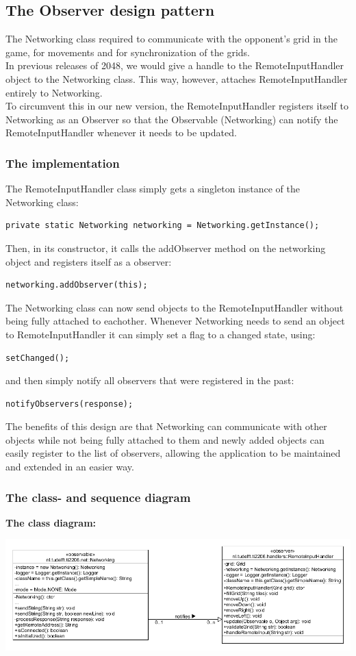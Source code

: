 \documentclass[a4paper,11pt,report]{scrartcl}
\begin{document}
\newpage\subsection{The Observer design pattern}
The Networking class required to communicate with the opponent's grid in the
game, for movements and for synchronization of the grids.\\

In previous releases of 2048, we would give a handle to the RemoteInputHandler
object to the Networking class. This way, however, attaches RemoteInputHandler
entirely to Networking.\\

To circumvent this in our new version, the RemoteInputHandler registers itself
to Networking as an Observer so that the Observable (Networking) can notify the
RemoteInputHandler whenever it needs to be updated.

\subsubsection{The implementation}
The RemoteInputHandler class simply gets a singleton instance of the Networking
class:
\begin{verbatim}
private static Networking networking = Networking.getInstance();
\end{verbatim}
Then, in its constructor, it calls the addObserver method on the networking
object and registers itself as a observer:
\begin{verbatim}
networking.addObserver(this);
\end{verbatim}
The Networking class can now send objects to the RemoteInputHandler without
being fully attached to eachother. Whenever Networking needs to send an object
to RemoteInputHandler it can simply set a flag to a changed state, using:
\begin{verbatim}
setChanged();
\end{verbatim}
and then simply notify all observers that were registered in the past:
\begin{verbatim}
notifyObservers(response);
\end{verbatim}
The benefits of this design are that Networking can communicate with other
objects while not being fully attached to them and newly added objects can
easily register to the list of observers, allowing the application to be
maintained and extended in an easier way.

\newpage\subsubsection{The class- and sequence diagram}
\textbf{The class diagram:}\\
\centerline{\includegraphics[scale=0.5]{sources/ObserverUML}}
\end{document}
